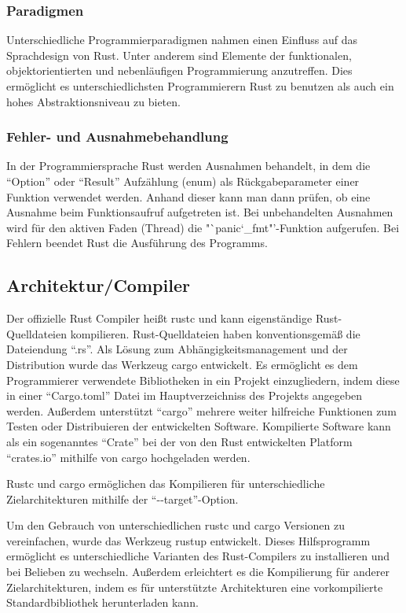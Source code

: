 \subsubsection{Paradigmen}

Unterschiedliche Programmierparadigmen nahmen einen Einfluss auf das Sprachdesign von Rust\cite{rustWikiDe}.
Unter anderem sind Elemente der funktionalen, objektorientierten und nebenläufigen Programmierung anzutreffen\cite{rustWikiDe}.
Dies ermöglicht es unterschiedlichsten Programmierern Rust zu benutzen als auch ein hohes Abstraktionsniveau zu
bieten\cite{rustWikiDe}.

\subsubsection{Fehler- und Ausnahmebehandlung}

In der Programmiersprache Rust werden Ausnahmen behandelt, in dem die "`Option"' oder "`Result"' Aufzählung (enum) als
Rückgabeparameter einer Funktion verwendet werden. Anhand dieser kann man dann prüfen, ob eine Ausnahme beim Funktionsaufruf
aufgetreten ist. Bei unbehandelten Ausnahmen wird für den aktiven Faden (Thread) die "`panic\char`_fmt"'-Funktion aufgerufen.
Bei Fehlern beendet Rust die Ausführung des Programms. 

\subsection{Architektur/Compiler}

Der offizielle Rust Compiler heißt rustc und kann eigenständige Rust-Quelldateien kompilieren. Rust-Quelldateien haben
konventionsgemäß die Dateiendung "`.rs"'. Als Lösung zum Abhängigkeitsmanagement und der Distribution wurde das Werkzeug cargo 
entwickelt. Es ermöglicht es dem Programmierer verwendete Bibliotheken in ein Projekt einzugliedern,
indem diese in einer "`Cargo.toml"' Datei im Hauptverzeichniss
des Projekts angegeben werden. Außerdem unterstützt "`cargo"' mehrere weiter hilfreiche Funktionen zum Testen oder
Distribuieren der entwickelten Software. Kompilierte Software kann als ein sogenanntes "`Crate"' bei der
von den Rust entwickelten Platform "`crates.io"' mithilfe von cargo hochgeladen werden.

Rustc und cargo ermöglichen das Kompilieren für unterschiedliche Zielarchitekturen mithilfe der "`-{}-target"'-Option.

Um den Gebrauch von unterschiedlichen rustc und cargo Versionen zu vereinfachen, wurde das Werkzeug rustup entwickelt. Dieses
Hilfsprogramm ermöglicht es unterschiedliche Varianten des Rust-Compilers zu installieren und bei Belieben zu wechseln.
Außerdem erleichtert es die Kompilierung für anderer Zielarchitekturen, indem es für unterstützte Architekturen eine
vorkompilierte Standardbibliothek herunterladen kann.


